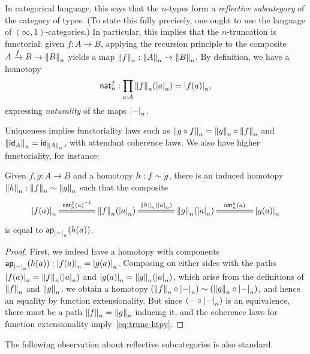 In categorical language, this says that the $n$-types form a \emph{reflective subcategory} of the category of types.
(To state this fully precisely, one ought to use the language of $(\infty,1)$-categories.)
In particular, this implies that the $n$-truncation is functorial:
given $f:A\to B$, applying the recursion principle to the composite $A\xrightarrow{f} B \to \trunc n B$ yields a map $\trunc n f: \trunc n A \to \trunc n B$.
By definition, we have a homotopy
\begin{equation}
  \mathsf{nat}^f_n : \prd{a:A} \trunc n f(\tproj n a) = \tproj n {f(a)},\label{eq:trunc-nat}
\end{equation}
expressing \emph{naturality} of the maps $\tproj n-$.

Uniqueness implies functoriality laws such as $\trunc n {g\circ f} = \trunc n g \circ \trunc n f$ and $\trunc n{\idfunc[A]} = \idfunc[\trunc n A]$, with attendant coherence laws.
We also have higher functoriality, for instance:

\begin{lem}\label{thm:trunc-htpy}
  Given $f,g:A\to B$ and a homotopy $h:f\htpy g$, there is an induced homotopy $\trunc n h : \trunc n f \htpy \trunc n g$ such that the composite
  \begin{equation}
    \xymatrix@C=3.6pc{\tproj n{f(a)} \ar@{=}[r]^-{\opp{\mathsf{nat}^f_n(a)}} &
      \trunc n f(\tproj n a) \ar@{=}[r]^-{\trunc n h(\tproj na)} &
      \trunc n g(\tproj n a) \ar@{=}[r]^-{\mathsf{nat}^g_n(a)} &
      \tproj n{g(a)}}\label{eq:trunc-htpy}
  \end{equation}
  is equal to $\apfunc{\tproj n-}(h(a))$.
\end{lem}
\begin{proof}
  First, we indeed have a homotopy with components $\apfunc{\tproj n-}(h(a)) : \tproj n{f(a)} = \tproj n{g(a)}$.
  Composing on either sides with the paths $\tproj n{f(a)} = \trunc n f(\tproj n a)$ and $\tproj n{g(a)} = \trunc n g(\tproj n a)$, which arise from the definitions of $\trunc n f$ and $\trunc ng$, we obtain a homotopy $(\trunc n f \circ \tproj n-) \htpy (\trunc n g \circ \tproj n-)$, and hence an equality by function extensionality.
  But since $(-\circ \tproj n-)$ is an equivalence, there must be a path $\trunc nf = \trunc ng$ inducing it, and the coherence laws for function extensionality imply~\eqref{eq:trunc-htpy}.
\end{proof}

The following observation about reflective subcategories is also standard.

